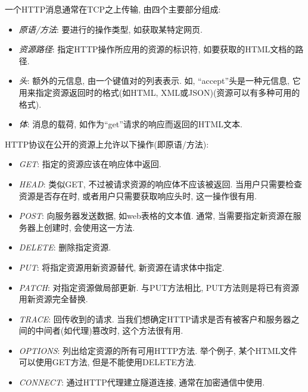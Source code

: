         一个HTTP消息通常在TCP之上传输, 由四个主要部分组成: 
        \begin{itemize}
          \item \textit{原语/方法}: 要进行的操作类型, 如获取某特定网页. 
          
            \item \textit{资源路径}: 指定HTTP操作所应用的资源的标识符, 如要获取的HTML文档的路径. 
            
            \item \textit{头}: 额外的元信息, 由一个键值对的列表表示. 如, “accept”头是一种元信息, 它用来指定资源返回时的格式(如HTML, XML或JSON)(资源可以有多种可用的格式). 
            
            \item \textit{体}: 消息的载荷, 如作为“get”请求的响应而返回的HTML文本. 
        \end{itemize}
        
        HTTP协议在公开的资源上允许以下操作(即原语/方法): 
        \begin{itemize}
          \item \textit{GET}: 指定的资源应该在响应体中返回. 
            \item \textit{HEAD}: 类似GET, 不过被请求资源的响应体不应该被返回. 当用户只需要检查资源是否存在时, 或者用户只需要获取响应头时, 这一操作很有用. 
            \item \textit{POST}: 向服务器发送数据, 如web表格的文本值. 通常, 当需要指定新资源在服务器上创建时, 会使用这一方法. 
            \item \textit{DELETE}: 删除指定资源. 
            \item \textit{PUT}: 将指定资源用新资源替代, 新资源在请求体中指定. 
            \item \textit{PATCH}: 对指定资源做局部更新. 与PUT方法相比, PUT方法则是将已有资源用新资源完全替换. 
            \item \textit{TRACE}: 回传收到的请求. 当我们想确定HTTP请求是否有被客户和服务器之间的中间者(如代理)篡改时, 这个方法很有用. 
            \item \textit{OPTIONS}: 列出给定资源的所有可用HTTP方法. 举个例子, 某个HTML文件可以使用GET方法, 但是不能使用DELETE方法. 
            \item \textit{CONNECT}: 通过HTTP代理建立隧道连接, 通常在加密通信中使用. 
        \end{itemize}
        
